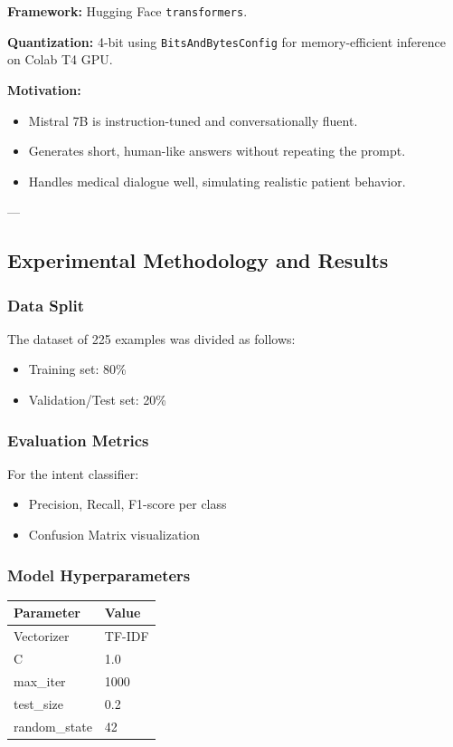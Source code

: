 \textbf{Framework:} Hugging Face \texttt{transformers}.

\textbf{Quantization:} 4-bit using \texttt{BitsAndBytesConfig} for memory-efficient inference on Colab T4 GPU.

\textbf{Motivation:}
\begin{itemize}
    \item Mistral 7B is instruction-tuned and conversationally fluent.
    \item Generates short, human-like answers without repeating the prompt.
    \item Handles medical dialogue well, simulating realistic patient behavior.
\end{itemize}

---

\subsection{Experimental Methodology and Results}

\subsubsection*{Data Split}
The dataset of 225 examples was divided as follows:
\begin{itemize}
    \item Training set: 80\% 
    \item Validation/Test set: 20\%
\end{itemize}

\subsubsection*{Evaluation Metrics}
For the intent classifier:
\begin{itemize}
    \item Precision, Recall, F1-score per class
    \item Confusion Matrix visualization
\end{itemize}

\subsubsection*{Model Hyperparameters}
\begin{center}
\begin{tabular}{|l|l|}
\hline
Parameter & Value \\
\hline
Vectorizer & TF-IDF \\
C & 1.0 \\
max\_iter & 1000 \\
test\_size & 0.2 \\
random\_state & 42 \\
\hline
\end{tabular}
\end{center}

